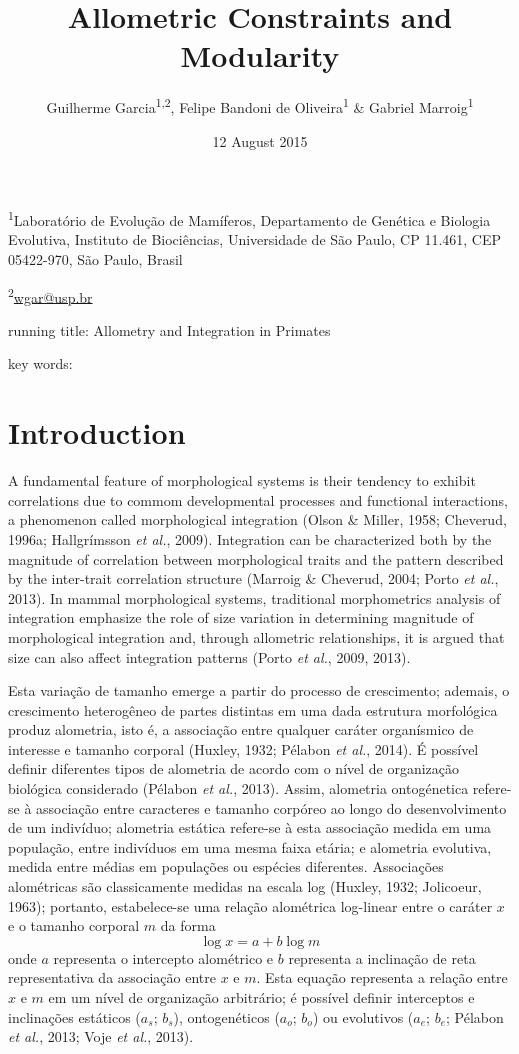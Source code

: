 \documentclass[12pt,]{article}
\title{Allometric Constraints and Modularity}
\author{Guilherme Garcia\textsuperscript{1,2}, Felipe Bandoni de
Oliveira\textsuperscript{1} \& Gabriel Marroig\textsuperscript{1}}
\date{12 August 2015}
\begin{document}
\maketitle


\linenumbers
\modulolinenumbers[2]

\onehalfspacing

\textsuperscript{1}Laboratório de Evolução de Mamíferos, Departamento de
Genética e Biologia Evolutiva, Instituto de Biociências, Universidade de
São Paulo, CP 11.461, CEP 05422-970, São Paulo, Brasil

\textsuperscript{2}\href{mailto:wgar@usp.br}{wgar@usp.br}

running title: Allometry and Integration in Primates

key words:

\section{Introduction}\label{introduction}

A fundamental feature of morphological systems is their tendency to
exhibit correlations due to commom developmental processes and
functional interactions, a phenomenon called morphological integration
(Olson \& Miller, 1958; Cheverud, 1996a; Hallgrímsson \emph{et al.},
2009). Integration can be characterized both by the magnitude of
correlation between morphological traits and the pattern described by
the inter-trait correlation structure (Marroig \& Cheverud, 2004; Porto
\emph{et al.}, 2013). In mammal morphological systems, traditional
morphometrics analysis of integration emphasize the role of size
variation in determining magnitude of morphological integration and,
through allometric relationships, it is argued that size can also affect
integration patterns (Porto \emph{et al.}, 2009, 2013).

Esta variação de tamanho emerge a partir do processo de crescimento;
ademais, o crescimento heterogêneo de partes distintas em uma dada
estrutura morfológica produz alometria, isto é, a associação entre
qualquer caráter organísmico de interesse e tamanho corporal (Huxley,
1932; Pélabon \emph{et al.}, 2014). É possível definir diferentes tipos
de alometria de acordo com o nível de organização biológica considerado
(Pélabon \emph{et al.}, 2013). Assim, alometria ontogénetica refere-se à
associação entre caracteres e tamanho corpóreo ao longo do
desenvolvimento de um indivíduo; alometria estática refere-se à esta
associação medida em uma população, entre indivíduos em uma mesma faixa
etária; e alometria evolutiva, medida entre médias em populações ou
espécies diferentes. Associações alométricas são classicamente medidas
na escala log (Huxley, 1932; Jolicoeur, 1963); portanto, estabelece-se
uma relação alométrica log-linear entre o caráter $x$ e o tamanho
corporal $m$ da forma \[
\log x = a + b \log m
\] onde $a$ representa o intercepto alométrico e $b$ representa a
inclinação de reta representativa da associação entre $x$ e $m$. Esta
equação representa a relação entre $x$ e $m$ em um nível de organização
arbitrário; é possível definir interceptos e inclinações estáticos
($a_s$; $b_s$), ontogenéticos ($a_o$; $b_o$) ou evolutivos ($a_e$;
$b_e$; Pélabon \emph{et al.}, 2013; Voje \emph{et al.}, 2013).
\end{document}
